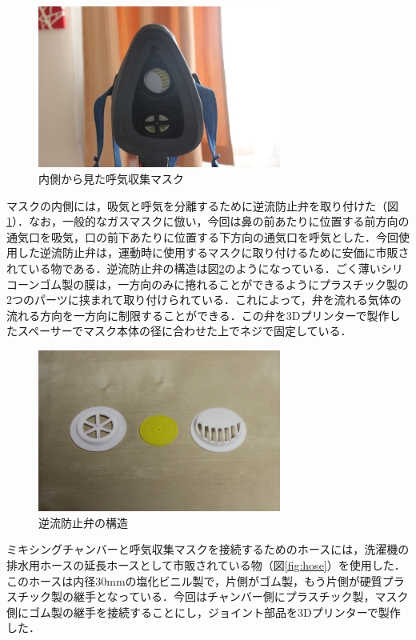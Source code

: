 \begin{figure}[H]
  \begin{center}
    \includegraphics[width=8cm]{fig/mask_rear}
    \caption{内側から見た呼気収集マスク}
    \label{fig:mask_rear}
  \end{center}
\end{figure}

マスクの内側には，吸気と呼気を分離するために逆流防止弁を取り付けた（図\ref{fig:mask_rear}）．なお，一般的なガスマスクに倣い，今回は鼻の前あたりに位置する前方向の通気口を吸気，口の前下あたりに位置する下方向の通気口を呼気とした．今回使用した逆流防止弁は，運動時に使用するマスクに取り付けるために安価に市販されている物である．逆流防止弁の構造は図\ref{fig:bulb}のようになっている．ごく薄いシリコーンゴム製の膜は，一方向のみに捲れることができるようにプラスチック製の2つのパーツに挟まれて取り付けられている．これによって，弁を流れる気体の流れる方向を一方向に制限することができる．この弁を3Dプリンターで製作したスペーサーでマスク本体の径に合わせた上でネジで固定している．

\begin{figure}[H]
  \begin{center}
    \includegraphics[width=8cm]{fig/bulb}
    \caption{逆流防止弁の構造}
    \label{fig:bulb}
  \end{center}
\end{figure}

ミキシングチャンバーと呼気収集マスクを接続するためのホースには，洗濯機の排水用ホースの延長ホースとして市販されている物（図\ref{fig:hose}）を使用した．このホースは内径30mmの塩化ビニル製で，片側がゴム製，もう片側が硬質プラスチック製の継手となっている．今回はチャンバー側にプラスチック製，マスク側にゴム製の継手を接続することにし，ジョイント部品を3Dプリンターで製作した．

